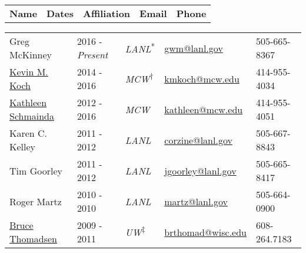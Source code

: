 
\normalsize


\begin{center}
\begin{minipage}{\textwidth}
\begin{tabular}{p{3.2cm}p{2.2cm}p{2.7cm}p{5.0cm}p{2.4cm}}
\textbf{Name} & \textbf{Dates}  & \textbf{Affiliation} & \textbf{Email} & \textbf{Phone} \\
\end{tabular}
\end{minipage}
\end{center}


\begin{center}
\begin{minipage}{\textwidth}
\begin{tabular}{p{3.2cm}p{2.2cm}p{2.7cm}p{5.0cm}p{2.4cm}}
Greg McKinney\label{greg_mckinney}& {2016 - \emph{Present}} & {\textit{LANL}}\textsuperscript{*} &  \href{mailto:gwm@lanl.gov}{gwm@lanl.gov} & 505-665-8367 \\  %

{\href{http://www.mcw.edu/radiology/faculty/Kevin-Koch-PhD.htm}{Kevin M. Koch}}\label{kevin_koch}& {2014 - 2016} & {\textit{MCW}}\textsuperscript{$\dagger$} &  \href{mailto:kmkoch@mcw.edu}{kmkoch@mcw.edu} & 414-955-4034 \\  %

{\href{http://www.mcw.edu/radiology/faculty/Kathleen-Schmainda-PhD.htm}{Kathleen Schmainda}}\label{kathleen_schmainda}& {2012 - 2016} & {\textit{MCW}}  & \href{mailto:kathleen@mcw.edu}{kathleen@mcw.edu} &  414-955-4051 \\ %

{Karen C. Kelley} \label{karen_kelley} &   {2011 - 2012} &{\textit{LANL}} & \href{mailto:corzine@lanl.gov}{corzine@lanl.gov} & 505-667-8843\\ %

{Tim Goorley} \label{tim_goorley}& {2011 - 2012} & {\textit{LANL}} &\href{mailto:jgoorley@lanl.gov}{jgoorley@lanl.gov} & 505-665-8417\\ %

{Roger Martz}\label{roger_martz} & {2010 - 2010} & {\textit{LANL}}  & \href{mailto:martz@lanl.gov}{martz@lanl.gov} &  505-664-0900\\ %

{\href{https://www.medphysics.wisc.edu/directory/thomadsen.php}{Bruce Thomadsen}} \label{bruce_thomadsen}& {2009 - 2011} & {\textit{UW}}\textsuperscript{$\ddagger$} &  \href{mailto:brthomad@wisc.edu}{brthomad@wisc.edu} &  608-264.7183 \\ %

\end{tabular}
\end{minipage}
\end{center}

